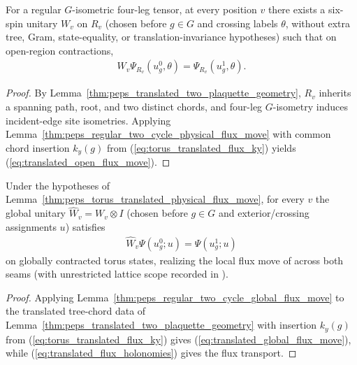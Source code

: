 \begin{lemma}%
    \label{thm:peps_torus_translated_physical_flux_move}
    \leanok
    For a regular $G$-isometric four-leg tensor, at every position $v$ there exists a six-spin unitary $W_v$ on $R_v$ (chosen before $g\in G$ and crossing labels $\theta$, without extra tree, Gram, state-equality, or translation-invariance hypotheses) such that on open-region contractions,
    \begin{align}
        W_v\Psi_{R_v}(u_g^0,\theta)=\Psi_{R_v}(u_g^1,\theta). \label{eq:translated_open_flux_move}
    \end{align}
\end{lemma}

\begin{proof}\leanok
    By Lemma~\ref{thm:peps_translated_two_plaquette_geometry}, $R_v$ inherits a spanning path, root, and two distinct chords, and four-leg $G$-isometry induces incident-edge site isometries.
    Applying Lemma~\ref{thm:peps_regular_two_cycle_physical_flux_move} with common chord insertion $k_y(g)$ from (\ref{eq:torus_translated_flux_ky}) yields (\ref{eq:translated_open_flux_move}).
\end{proof}

\begin{theorem}%
    \label{thm:peps_torus_translated_global_flux_move}
    \leanok
    Under the hypotheses of Lemma~\ref{thm:peps_torus_translated_physical_flux_move}, for every $v$ the global unitary $\widehat W_v=W_v\otimes I$ (chosen before $g\in G$ and exterior/crossing assignments $u$) satisfies
    \begin{align}
        \widehat W_v\Psi(u_g^0;u)=\Psi(u_g^1;u) \label{eq:translated_global_flux_move}
    \end{align}
    on globally contracted torus states, realizing the local flux move of \cite[Theorem~6.16]{Schuch2010PEPS} across both seams (with unrestricted lattice scope recorded in \cite{gap:rmp_peps_quantum_double_g_isometry}).
\end{theorem}

\begin{proof}\leanok
    Applying Lemma~\ref{thm:peps_regular_two_cycle_global_flux_move} to the translated tree-chord data of Lemma~\ref{thm:peps_translated_two_plaquette_geometry} with insertion $k_y(g)$ from (\ref{eq:torus_translated_flux_ky}) gives (\ref{eq:translated_global_flux_move}), while (\ref{eq:translated_flux_holonomies}) gives the flux transport.
\end{proof}
